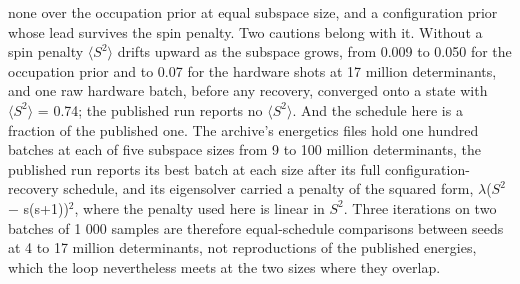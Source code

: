 \documentclass[11pt]{article}
\begin{document}
none over the occupation prior at equal subspace size, and a configuration prior whose lead survives the spin penalty. Two cautions belong with it. Without a spin penalty $\langle S^{2}\rangle$ drifts upward as the subspace grows, from 0.009 to 0.050 for the occupation prior and to 0.07 for the hardware shots at 17 million determinants, and one raw hardware batch, before any recovery, converged onto a state with $\langle S^{2}\rangle$ = 0.74; the published run reports no $\langle S^{2}\rangle$. And the schedule here is a fraction of the published one. The archive's energetics files hold one hundred batches at each of five subspace sizes from 9 to 100 million determinants, the published run reports its best batch at each size after its full configuration-recovery schedule, and its eigensolver carried a penalty of the squared form, $\lambda$($S^{2}$ $-$ s(s+1))$^{2}$, where the penalty used here is linear in $S^{2}$. Three iterations on two batches of 1 000 samples are therefore equal-schedule comparisons between seeds at 4 to 17 million determinants, not reproductions of the published energies, which the loop nevertheless meets at the two sizes where they overlap.
\end{document}
